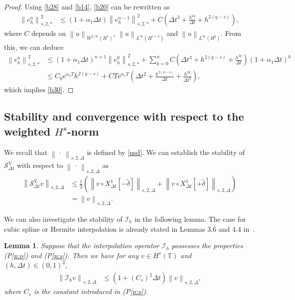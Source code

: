 \documentclass[10pt,a4paper,tbtags,leqno]{amsart}
\newtheorem{lemma}[theorem]{Lemma}
\theoremstyle{definition}
\numberwithin{equation}{section}
\def\norm#1#2{\left\|#2\right\|_{#1}}
\begin{document}
\begin{proof}
  Using \eqref{b28} and \eqref{b14}, \eqref{b20} can be rewritten as 
  \begin{align} 
    \norm{s, 2, \ast}{e_h^n}^2 & \leq \left(1 + \alpha_1 \Delta t \right) \norm{s, 2, \ast}{e_h^{n - 1}}^2 + C \left(\Delta t^3 + \frac{h^{2q}}{\Delta t} + h^{2 (q - s)}\right), 
  \end{align} 
  where $ C $ depends on $ \norm{W^{2, \infty}(H^{s})}{u} $, $ \norm{L^{\infty}(H^{s+4})}{u} $ and $ \norm{L^{\infty}(H^{q})}{u} $. From this, we can deduce 
  \begin{align} 
    \norm{s, 2, \ast}{e_h^n}^2 & \leq \left(1 + \alpha_1 \Delta t \right)^{n + 1} \norm{s, 2, \ast}{e_h^0}^2 + \sum_{k = 0}^{n} C \left(\Delta t^3 + h^{2 (q - s)} + \frac{h^{2q}}{\Delta t}\right) \left(1 + \alpha_1 \Delta t \right)^k \\ 
    & \leq C_0 \mathrm{e}^{\alpha_1 T} h^{2 (q - s)} + C T \mathrm{e}^{\alpha_1 T} \left(\Delta t^2 + \frac{h^{2 (q - s)}}{\Delta t} + \frac{h^{2q}}{\Delta t^2}\right), 
  \end{align} 
  which implies \eqref{b30}. 
\end{proof} 

\subsection{Stability and convergence with respect to the weighted $ H^s $-norm} 

We recall that $ \norm{s, 2, \Delta}{\, \cdot \,} $ is defined by \eqref{nsd}. We can establish the stability of $ \mathcal{S}_{\Delta t}^{\mathrm{V}} $ with respect to $ \norm{s, 2, \Delta}{\, \cdot \,} $ as 
\begin{align} 
  \norm{s, 2, \Delta}{\mathcal{S}_{\Delta t}^{\mathrm{V}} v} & \leq \frac{1}{2} \left(\norm{s, 2, \Delta}{v \circ {X_{\Delta t}^1}[- \tilde{\delta}]} + \norm{s, 2, \Delta}{v \circ {X_{\Delta t}^1}[+ \tilde{\delta}]}\right) \\ & = \norm{s, 2, \Delta}{v}. \label{b7-3} 
\end{align} 

We can also investigate the stability of $ \mathcal{I}_{h} $ in the following lemma. 
The case for cubic spline or Hermite interpolation is already stated in Lemmas 3.6 and 4.4 in~\cite{24KaTa}. 
\begin{lemma} \label{lem:w} 
  Suppose that the interpolation operator $ \mathcal{I}_{h} $ possesses the properties (P\ref{p:o}) and (P\ref{p:s}). Then we have for any $ v \in H^s (\mathbb{T}) $ and $ (h, \Delta t) \in (0,1)^2 $, 
  \begin{align} 
    \norm{s, 2, \Delta}{\mathcal{I}_{h} v} & \leq \left(1 + (C_s)^2 \Delta t \right) \norm{s, 2, \Delta}{v}, 
  \end{align} 
  where $ C_s $ is the constant introduced in (P\ref{p:s}). 
\end{lemma} 
\end{document}

